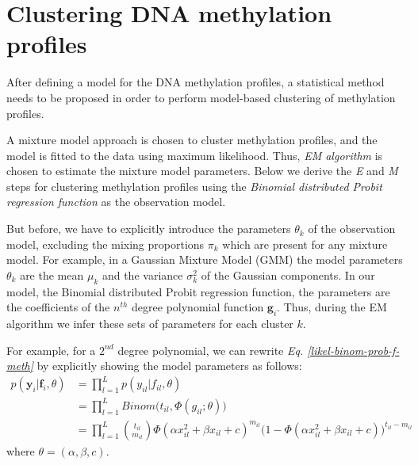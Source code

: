 \section{Clustering DNA methylation profiles} \label{cluster-meth-s}
After defining a model for the DNA methylation profiles, a statistical method needs to be proposed in order to perform model-based clustering of methylation profiles. 

A mixture model approach \citep{McLachlan1988} is chosen to cluster methylation profiles, and the model is fitted to the data using maximum likelihood. Thus, \emph{EM algorithm} \citep{Dempster1977} is chosen to estimate the mixture model parameters. Below we derive the \emph{E} and \emph{M} steps for clustering methylation profiles using the \emph{Binomial distributed Probit regression function} as the observation model. 

But before, we have to explicitly introduce the parameters $\theta_{k}$ of the observation model, excluding the mixing proportions $\pi_{k}$ which are present for any mixture model. For example, in a Gaussian Mixture Model (GMM) the model parameters $\theta_{k}$ are the mean $\mu_{k}$ and the variance $\sigma_{k}^{2}$ of the Gaussian components. In our model, the Binomial distributed Probit regression function, the parameters are the coefficients of the $n^{th}$ degree polynomial function $\mathbf{g}_{i}$. Thus, during the EM algorithm we infer these sets of parameters for each cluster $k$. 

For example, for a $2^{nd}$ degree polynomial, we can rewrite \emph{Eq. \ref{likel-binom-prob-f-meth}} by explicitly showing the model parameters as follows:
\begin{equation} \label{likel-binom-prob-example1-f-meth}
  \begin{split}
	p(\mathbf{y}_{i}|\mathbf{f}_{i}, \theta) & = \prod_{l=1}^{L} p(y_{il}|f_{il}, \theta) \\
							 & = \prod_{l=1}^{L} Binom \big(t_{il}, \Phi(g_{il}; \theta)\big) \\
							 & = \prod_{l=1}^{L} \binom{t_{il}}{m_{il}} \Phi(\alpha x_{il}^{2} + \beta x_{il} + c)^{m_{il}} (1 - \Phi(\alpha x_{il}^{2} + \beta x_{il} + c)\big)^{t_{il} - m_{il}}
  \end{split}
\end{equation}
where $\theta = (\alpha, \beta, c)$.

